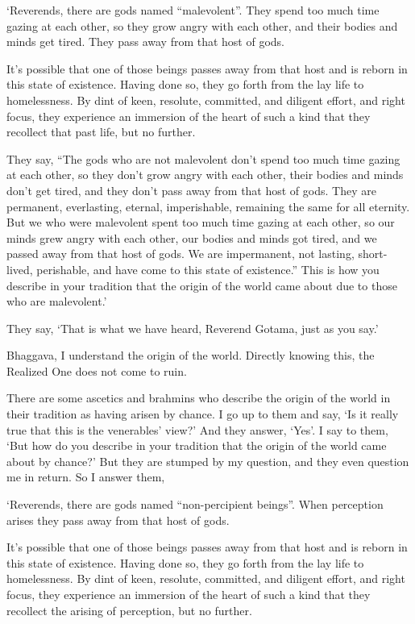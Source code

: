 \documentclass[12pt,openany]{book}%
\begin{document}
‘Reverends, there are gods named “malevolent”. They spend too much time gazing at each other, so they grow angry with each other, and their bodies and minds get tired. They pass away from that host of gods. 

It’s possible that one of those beings passes away from that host and is reborn in this state of existence. Having done so, they go forth from the lay life to homelessness. By dint of keen, resolute, committed, and diligent effort, and right focus, they experience an immersion of the heart of such a kind that they recollect that past life, but no further. 

They say, “The gods who are not malevolent don’t spend too much time gazing at each other, so they don’t grow angry with each other, their bodies and minds don’t get tired, and they don’t pass away from that host of gods. They are permanent, everlasting, eternal, imperishable, remaining the same for all eternity. But we who were malevolent spent too much time gazing at each other, so our minds grew angry with each other, our bodies and minds got tired, and we passed away from that host of gods. We are impermanent, not lasting, short-lived, perishable, and have come to this state of existence.” This is how you describe in your tradition that the origin of the world came about due to those who are malevolent.’ 

They say, ‘That is what we have heard, Reverend Gotama, just as you say.’ 

Bhaggava, I understand the origin of the world. Directly knowing this, the Realized One does not come to ruin. 

There are some ascetics and brahmins who describe the origin of the world in their tradition as having arisen by chance. I go up to them and say, ‘Is it really true that this is the venerables’ view?’ And they answer, ‘Yes’. I say to them, ‘But how do you describe in your tradition that the origin of the world came about by chance?’ But they are stumped by my question, and they even question me in return. So I answer them, 

‘Reverends, there are gods named “non-percipient beings”. When perception arises they pass away from that host of gods. 

It’s possible that one of those beings passes away from that host and is reborn in this state of existence. Having done so, they go forth from the lay life to homelessness. By dint of keen, resolute, committed, and diligent effort, and right focus, they experience an immersion of the heart of such a kind that they recollect the arising of perception, but no further. 
\end{document}

